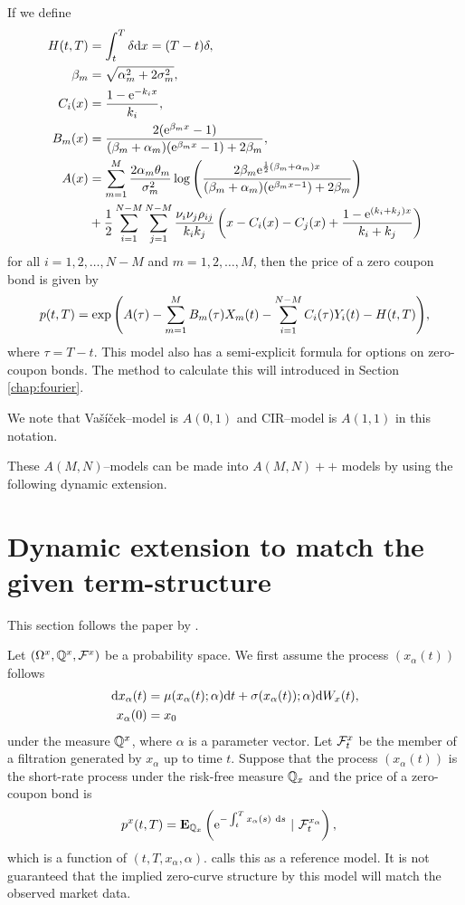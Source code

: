 If we define
\begin{align}
H(t,T) &= \int_t^T \delta \mathrm{d} x = (T-t) \delta, \\
\beta_m &= \sqrt{\alpha_m^2 + 2 \sigma_m^2} , \\
C_i(x) &= \frac{1 - \mathrm{e}^{-k_i x}}{k_i}, \\
B_m(x) &= \frac{ 2 ( \mathrm{e}^{\beta_m x} - 1 ) }{ (\beta_m + \alpha_m)( \mathrm{e}^{\beta_m x} - 1) + 2 \beta_m }, \\
A(x) &= \sum_{m=1}^M \frac{2 \alpha_m \theta_m }{\sigma_m^2} \log \left( \frac{ 2 \beta_m \mathrm{e}^{ \frac{1}{2} (\beta_m + \alpha_m) x } }{ (\beta_m + \alpha_m)( \mathrm{e}^{\beta_m x -1} ) + 2 \beta_m } \right) \\
&+ \frac{1}{2} \sum_{i=1}^{N-M} \sum_{j=1}^{N-M} \frac{\nu_i \nu_j \rho_{ij}}{k_i k_j} \left( x - C_i(x) - C_j(x) + \frac{1-\mathrm{e}^{(k_i+k_j)x}}{k_i + k_j} \right)
\end{align}
for all $i = 1,2, \ldots, N-M$ and $m=1,2, \ldots, M$, then the price of a zero coupon bond is given by
\begin{align}
p (t,T) = \exp{ \left( A(\tau) - \sum_{m=1}^M B_m(\tau) X_m(t) - \sum_{i=1}^{N-M} C_i(\tau) Y_i(t) - H(t,T) \right) },
\end{align}
where $\tau = T-t$. This model also has a semi-explicit formula for options on zero-coupon bonds. The method to calculate this will introduced in Section \ref{chap:fourier}.

We note that  Va\v{s}\'{i}\v{c}ek--model is $A(0,1)$ and CIR--model is $A(1,1)$ in this notation.

These $A(M,N)$--models can be made into $A(M,N)++$ models by using the following dynamic extension.

\section{Dynamic extension to match the given term-structure}
\label{sec:dynamicextension}

This section follows the paper by \textcite{brigomercurio2001deterministic}.

Let $(\Omega^x, \mathbb{Q}^x, \mathcal{F}^x)$ be a probability space. We first assume the process $(x_{\alpha}(t))$ follows
	\begin{align}
		\mathrm{d} x_{\alpha}(t) &= \mu(x_{\alpha}(t); \alpha) \mathrm{d} t + \sigma(x_{\alpha}(t)); \alpha) \mathrm{d} W_x(t) , \\
		x_{\alpha}(0) &= x_0
	\end{align}
under the measure $\mathbb{Q}^x$, where $\alpha$ is a parameter vector. Let $\mathcal{F}_t^x$ be the member of a filtration generated by $x_{\alpha}$ up to time $t$. Suppose that the process $(x_{\alpha}(t))$ is the short-rate process under the risk-free measure $\mathbb{Q}_x$ and the price of a zero-coupon bond is 
	\begin{align}
		p^x(t,T) &= \operatorname{\boldsymbol{\mathrm{E}}}_{\mathbb{Q}_x} \left( \mathrm{e}^{ - \int_t^T x_{\alpha}(s) \ \mathrm{d} s} \ | \ \mathcal{F}_t^{x_{\alpha}} \right) ,
	\end{align}
which is a function of $(t,T,x_{\alpha}, \alpha)$. \textcite{brigomercurio2001deterministic} calls this as a reference model. It is not guaranteed that the implied zero-curve structure by this model will match the observed market data.

